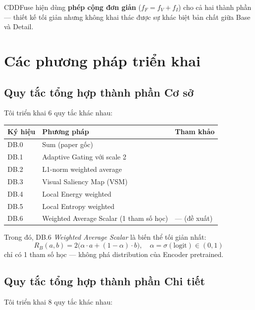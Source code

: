 \documentclass[12pt,a4paper]{article}
\begin{document}
CDDFuse \cite{zhao2023cddfuse} hiện dùng \textbf{phép cộng đơn giản} ($f_F = f_V + f_I$) cho cả hai thành phần --- thiết kế tối giản nhưng không khai thác được sự khác biệt bản chất giữa Base và Detail.

\section{Các phương pháp triển khai}

\subsection{Quy tắc tổng hợp thành phần Cơ sở}

Tôi triển khai 6 quy tắc khác nhau:

\begin{table}[h]
\centering
\small
\begin{tabular}{lll}
\toprule
\textbf{Ký hiệu} & \textbf{Phương pháp} & \textbf{Tham khảo} \\
\midrule
DB.0 & Sum (paper gốc) & \cite{zhao2023cddfuse} \\
DB.1 & Adaptive Gating với scale 2 & \cite{prabhakar2017deepfuse} \\
DB.2 & L1-norm weighted average & \cite{li2018densefuse} \\
DB.3 & Visual Saliency Map (VSM) & \cite{wang2008vsm, li2013guided} \\
DB.4 & Local Energy weighted & \cite{liu2018survey} \\
DB.5 & Local Entropy weighted & \cite{liu2018survey} \\
DB.6 & Weighted Average Scalar (1 tham số học) & --- (đề xuất) \\
\bottomrule
\end{tabular}
\end{table}

Trong đó, DB.6 \emph{Weighted Average Scalar} là biến thể tối giản nhất:
\begin{equation}
R_B(a, b) = 2\big(\alpha \cdot a + (1 - \alpha) \cdot b\big), \quad \alpha = \sigma(\text{logit}) \in (0, 1)
\end{equation}
chỉ có 1 tham số học --- không phá distribution của Encoder pretrained.

\subsection{Quy tắc tổng hợp thành phần Chi tiết}

Tôi triển khai 8 quy tắc khác nhau:
\end{document}
